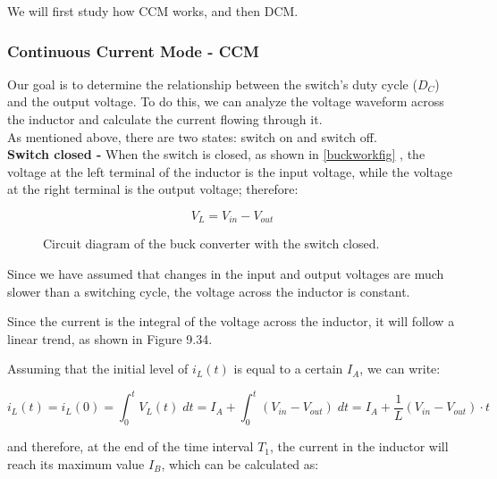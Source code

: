 \documentclass[../main.tex]{subfiles}
\begin{document}
We will first study how CCM works, and then DCM.\\

\subsubsection*{Continuous Current Mode - CCM}

Our goal is to determine the relationship between the switch’s duty cycle ($D_C$) and the output voltage. To do this, we can analyze the voltage waveform across the inductor and calculate the current flowing through it.\\

As mentioned above, there are two states: switch on and switch off.\\

\textbf{Switch closed -} When the switch is closed, as shown in \autoref{buckworkfig} , the
voltage at the left terminal of the inductor is the input voltage, while
the voltage at the right terminal is the output voltage; therefore:

\begin{equation}
	V_L = V_{in} - V_{out}
\end{equation}


\begin{figure}[h!]
\begin{center}



\label{buckworkfig}
\caption{Circuit diagram of the buck converter with the switch closed.}	
\end{center}	
\end{figure}


Since we have assumed that changes in the input and output voltages are much slower than a switching cycle, the voltage across the inductor is constant. 

Since the current is the integral of the voltage across the inductor, it will follow a linear trend, as shown in Figure 9.34.

Assuming that the initial level of $i_L(t)$ is equal to a certain $I_A$, we can write:

\begin{equation}
	i_L(t) = i_L(0) = \int_0^t V_L(t) \;dt = I_A + \int_0^t (V_{in} - V_{out})\;dt = I_A + \frac{1}{L} (V_{in} - V_{out}) \cdot t
\end{equation}

and therefore, at the end of the time interval $T_1$, the current in the inductor will reach its maximum value $I_B$, which can be calculated as:
\end{document}
